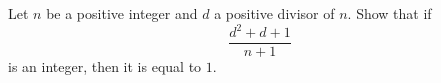 Let $n$ be a positive integer and $d$ a positive divisor of $n$. Show that if
$$\frac{d^2+d+1}{n+1}$$
is an integer, then it is equal to $1$.
